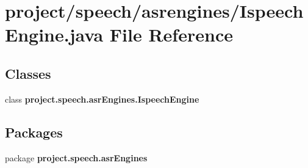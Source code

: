 \section{project/speech/asrengines/\+Ispeech\+Engine.java File Reference}
\label{_ispeech_engine_8java}
\subsection*{Classes}
\begin{DoxyCompactItemize}
\item 
class {\bf project.\+speech.\+asr\+Engines.\+Ispeech\+Engine}
\end{DoxyCompactItemize}
\subsection*{Packages}
\begin{DoxyCompactItemize}
\item 
package {\bf project.\+speech.\+asr\+Engines}
\end{DoxyCompactItemize}
